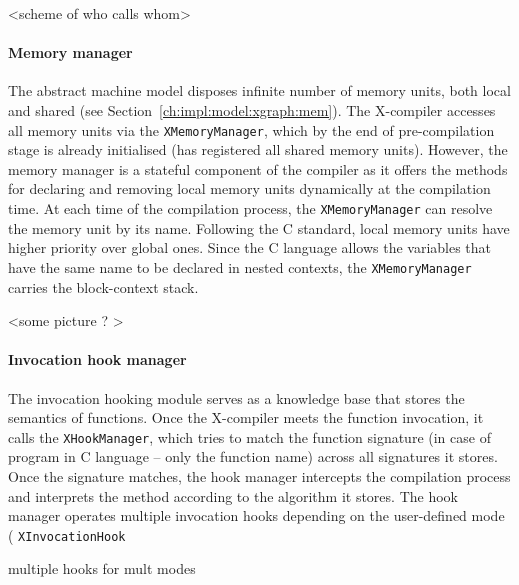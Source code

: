 <scheme of who calls whom>



\paragraph{Memory manager}
\label{ch:impl:proc:x-compiler:mem}

The \xgraph{} abstract machine model disposes infinite number of memory units, both local and shared (see Section~\ref{ch:impl:model:xgraph:mem}).
The X-compiler accesses all memory units via the \texttt{XMemoryManager}, which by the end of pre-compilation stage is already initialised (has registered all shared memory units).
However, the memory manager is a stateful component of the compiler as it offers the methods for declaring and removing local memory units dynamically at the compilation time.
At each time of the compilation process, the \texttt{XMemoryManager} can resolve the memory unit by its name.
Following the C standard, local memory units have higher priority over global ones.
Since the C language allows the variables that have the same name to be declared in nested contexts, the \texttt{XMemoryManager} carries the block-context stack. %

<some picture ? >

\paragraph{Invocation hook manager}
\label{ch:impl:proc:x-compiler:hooking}

The invocation hooking module serves as a knowledge base that stores the semantics of functions.
Once the X-compiler meets the function invocation, it calls the \texttt{XHookManager}, which tries to match the function signature (in case of program in C language -- only the function name) across all signatures it stores.
Once the signature matches, the hook manager intercepts the compilation process and interprets the method according to the algorithm it stores.
The hook manager operates multiple invocation hooks depending on the user-defined mode (
 \texttt{XInvocationHook} 

multiple hooks for mult modes

